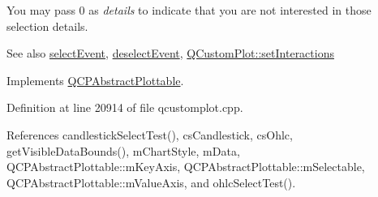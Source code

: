 You may pass 0 as {\itshape details} to indicate that you are not interested in those selection details.

\begin{DoxySeeAlso}{See also}
\hyperlink{class_q_c_p_abstract_plottable_a16aaad02456aa23a759efd1ac90c79bf}{select\+Event}, \hyperlink{class_q_c_p_abstract_plottable_a6fa0d0f95560ea8b01ee13f296dab2b1}{deselect\+Event}, \hyperlink{class_q_custom_plot_a5ee1e2f6ae27419deca53e75907c27e5}{Q\+Custom\+Plot\+::set\+Interactions} 
\end{DoxySeeAlso}


Implements \hyperlink{class_q_c_p_abstract_plottable_a38efe9641d972992a3d44204bc80ec1d}{Q\+C\+P\+Abstract\+Plottable}.



Definition at line 20914 of file qcustomplot.\+cpp.



References candlestick\+Select\+Test(), cs\+Candlestick, cs\+Ohlc, get\+Visible\+Data\+Bounds(), m\+Chart\+Style, m\+Data, Q\+C\+P\+Abstract\+Plottable\+::m\+Key\+Axis, Q\+C\+P\+Abstract\+Plottable\+::m\+Selectable, Q\+C\+P\+Abstract\+Plottable\+::m\+Value\+Axis, and ohlc\+Select\+Test().


